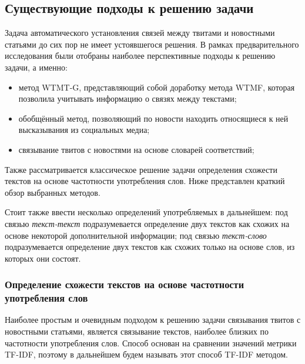 \subsection{Существующие подходы к решению задачи}
    Задача автоматического установления связей между твитами и новостными статьями до сих пор не имеет устоявшегося решения.
    В рамках предварительного исследования были отобраны наиболее перспективные подходы к решению задачи, а именно:
    \begin{itemize}
        \item метод WTMT-G, представляющий собой доработку метода WTMF, которая позволила учитывать информацию о связях между текстами;
        \item обобщённый метод, позволяющий по новости находить относящиеся к ней высказывания из социальных медиа;
        \item связывание твитов с новостями на основе словарей соответствий;
    \end{itemize}
    Также рассматривается классическое решение задачи определения схожести текстов на основе частотности употребления слов.
    Ниже представлен краткий обзор выбранных методов.

    Стоит также ввести несколько определений употребляемых в дальнейшем:
    под связью \textit{текст-текст} подразумевается определение двух текстов как схожих на основе некоторой дополнительной информации;
    под связью \textit{текст-слово} подразумевается определение двух текстов как схожих только на основе слов, из которых они состоят.

    \subsubsection{Определение схожести текстов на основе частотности употребления слов}
        Наиболее простым и очевидным подходом к решению задачи связывания твитов с новостными статьями, является связывание текстов,
        наиболее близких по частотности употребления слов. Способ основан на сравнении значений метрики TF-IDF, поэтому в дальнейшем будем называть этот способ TF-IDF методом.

